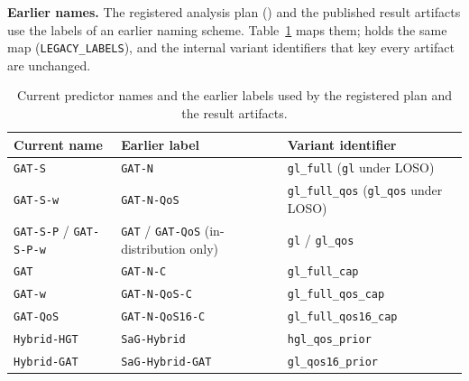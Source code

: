 \documentclass[preprint,3p]{elsarticle}
\begin{document}
\noindent\textbf{Earlier names.} The registered analysis plan () and the published result artifacts use the labels of an earlier naming scheme. Table~\ref{tab:supp-names} maps them;  holds the same map (\texttt{LEGACY\_LABELS}), and the internal variant identifiers that key every artifact are unchanged.

\begin{table}[htbp]
\centering
\small
\caption{Current predictor names and the earlier labels used by the registered plan and the result artifacts.}
\label{tab:supp-names}
\begin{tabular}{lll}
\toprule
\textbf{Current name} & \textbf{Earlier label} & \textbf{Variant identifier} \\
\midrule
\texttt{GAT-S} & \texttt{GAT-N} & \texttt{gl\_full} (\texttt{gl} under LOSO) \\
\texttt{GAT-S-w} & \texttt{GAT-N-QoS} & \texttt{gl\_full\_qos} (\texttt{gl\_qos} under LOSO) \\
\texttt{GAT-S-P} / \texttt{GAT-S-P-w} & \texttt{GAT} / \texttt{GAT-QoS} (in-distribution only) & \texttt{gl} / \texttt{gl\_qos} \\
\texttt{GAT} & \texttt{GAT-N-C} & \texttt{gl\_full\_cap} \\
\texttt{GAT-w} & \texttt{GAT-N-QoS-C} & \texttt{gl\_full\_qos\_cap} \\
\texttt{GAT-QoS} & \texttt{GAT-N-QoS16-C} & \texttt{gl\_full\_qos16\_cap} \\
\texttt{Hybrid-HGT} & \texttt{SaG-Hybrid} & \texttt{hgl\_qos\_prior} \\
\texttt{Hybrid-GAT} & \texttt{SaG-Hybrid-GAT} & \texttt{gl\_qos16\_prior} \\
\bottomrule
\end{tabular}
\end{table}
\end{document}
